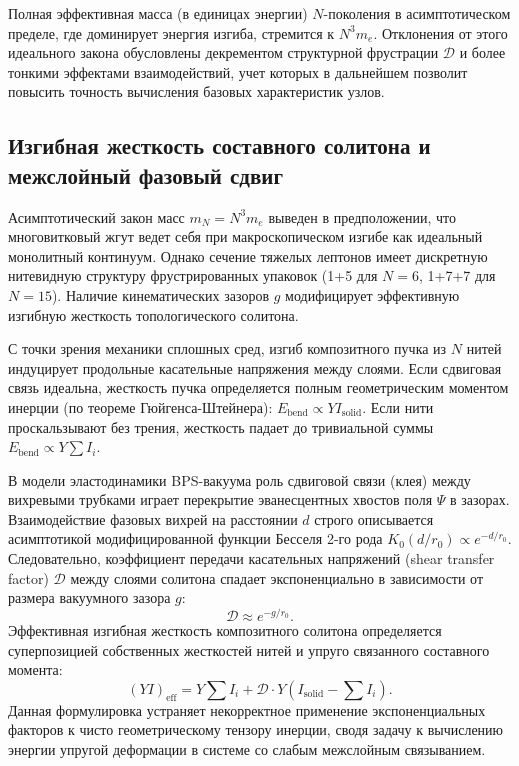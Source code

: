 \documentclass[11pt,a4paper]{article}
\begin{document}
	Полная эффективная масса (в единицах энергии) $N$-поколения в асимптотическом пределе, где доминирует энергия изгиба, стремится к $N^3 m_e$. Отклонения от этого идеального закона обусловлены декрементом структурной фрустрации $\mathcal{D}$ и более тонкими эффектами взаимодействий, учет которых в дальнейшем позволит повысить точность вычисления базовых характеристик узлов.
	
	\subsection{Изгибная жесткость составного солитона и межслойный фазовый сдвиг}
	Асимптотический закон масс $m_N = N^3 m_e$ выведен в предположении, что многовитковый жгут ведет себя при макроскопическом изгибе как идеальный монолитный континуум. Однако сечение тяжелых лептонов имеет дискретную нитевидную структуру фрустрированных упаковок (1+5 для $N=6$, 1+7+7 для $N=15$). Наличие кинематических зазоров $g$ модифицирует эффективную изгибную жесткость топологического солитона.
	
	С точки зрения механики сплошных сред, изгиб композитного пучка из $N$ нитей индуцирует продольные касательные напряжения между слоями. Если сдвиговая связь идеальна, жесткость пучка определяется полным геометрическим моментом инерции (по теореме Гюйгенса-Штейнера): $E_{\text{bend}} \propto Y I_{\text{solid}}$. Если нити проскальзывают без трения, жесткость падает до тривиальной суммы $E_{\text{bend}} \propto Y \sum I_i$.
	
	В модели эластодинамики BPS-вакуума роль сдвиговой связи (клея) между вихревыми трубками играет перекрытие эванесцентных хвостов поля $\Psi$ в зазорах. Взаимодействие фазовых вихрей на расстоянии $d$ строго описывается асимптотикой модифицированной функции Бесселя 2-го рода $K_0(d/r_0) \propto e^{-d/r_0}$. Следовательно, коэффициент передачи касательных напряжений (shear transfer factor) $\mathcal{D}$ между слоями солитона спадает экспоненциально в зависимости от размера вакуумного зазора $g$:
	\begin{equation}
		\mathcal{D} \approx e^{-g/r_0}.
	\end{equation}
	Эффективная изгибная жесткость композитного солитона определяется суперпозицией собственных жесткостей нитей и упруго связанного составного момента:
	\begin{equation}
		(Y I)_{\text{eff}} = Y \sum I_i + \mathcal{D} \cdot Y \left( I_{\text{solid}} - \sum I_i \right).
	\end{equation}
	Данная формулировка устраняет некорректное применение экспоненциальных факторов к чисто геометрическому тензору инерции, сводя задачу к вычислению энергии упругой деформации в системе со слабым межслойным связыванием.
	
\end{document}
